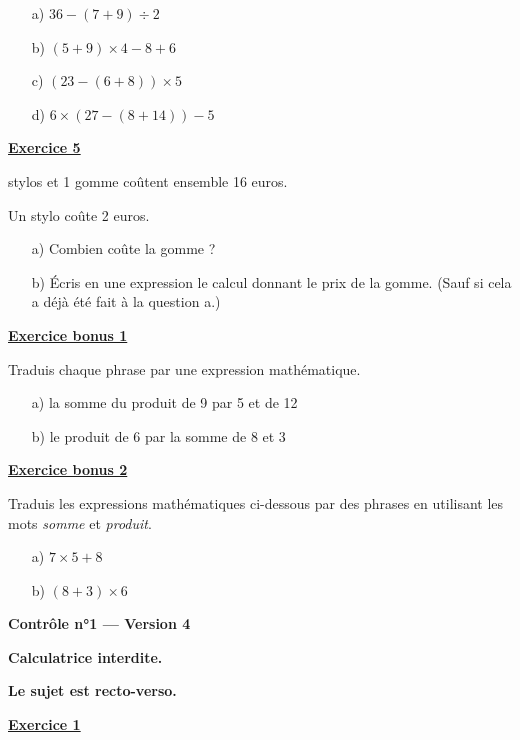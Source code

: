 \documentclass[13pt]{extarticle}
\newcommand{\exo}[1]{%
  \vspace{0.8em}%
  \noindent\large\underline{\textbf{Exercice #1}}%
  \vspace{0.2em}\par%
}
\newcommand{\exobonus}[1]{%
  \vspace{0.8em}%
  \noindent\large\underline{\textbf{Exercice bonus #1}}%
  \vspace{0.2em}\par%
}
\newcommand{\entetecontrole}[1]{%
\begin{center}
\textbf{\huge{Contrôle n°1 --- Version #1}}
\end{center}

\begin{center}
\textbf{Calculatrice interdite.}\par
\textbf{Le sujet est recto-verso.}

\end{center}
}
\begin{document}
\begin{itemize}
  \item[a)] $36 - (7 + 9) \div 2$
  \item[b)] $(5 + 9) \times 4 - 8 + 6$
  \item[c)] $(23 - (6 + 8)) \times 5$
  \item[d)] $6 \times (27 - (8 + 14)) - 5$
\end{itemize}

\newpage

\exo{5}

 stylos et 1 gomme coûtent ensemble 16 euros.

\noindent Un stylo coûte 2 euros.

\begin{itemize}
  \item[a)] Combien coûte la gomme ?
  \item[b)] Écris en une expression le calcul donnant le prix de la gomme. (Sauf si cela a déjà été fait à la question a.)
\end{itemize}

\exobonus{1}

\noindent Traduis chaque phrase par une expression mathématique.

\begin{itemize}
  \item[a)] la somme du produit de 9 par 5 et de 12
  \item[b)] le produit de 6 par la somme de 8 et 3
\end{itemize}

\exobonus{2}

\noindent Traduis les expressions mathématiques ci-dessous par des phrases en utilisant les mots \emph{somme} et \emph{produit}.

\begin{itemize}
  \item[a)] $7 \times 5 + 8$
  \item[b)] $(8 + 3) \times 6$
\end{itemize}

\newpage

\entetecontrole{4}
\exo{1}
\end{document}
